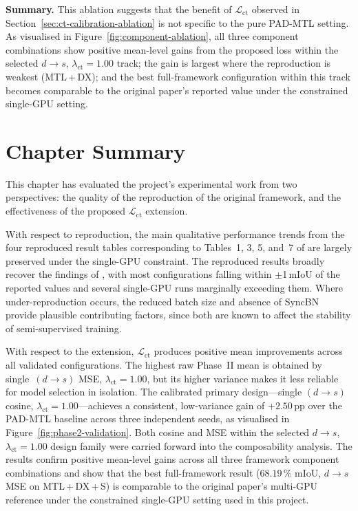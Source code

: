 \vspace{4pt}
\noindent
\textbf{Summary.}
This ablation suggests that the benefit of $\mathcal{L}_\text{ct}$
observed in Section~\ref{sec:ct-calibration-ablation} is not specific to
the pure PAD-MTL setting. As visualised in
Figure~\ref{fig:component-ablation}, all three component combinations
show positive mean-level gains from the proposed loss within the selected
$d{\rightarrow}s$, $\lambda_\text{ct}=1.00$ track; the gain is largest
where the reproduction is weakest (MTL\,+\,DX); and the best
full-framework configuration within this track becomes comparable to the
original paper's reported value under the constrained single-GPU setting.

\section{Chapter Summary}
\label{sec:chapter4_summary}

\noindent
This chapter has evaluated the project's experimental work from two
perspectives: the quality of the reproduction of the original framework,
and the effectiveness of the proposed $\mathcal{L}_\text{ct}$ extension.

With respect to reproduction, the main qualitative performance trends from
the four reproduced result tables corresponding to Tables~1, 3, 5, and~7
of \cite{hoyer2023improving} are largely preserved under the single-GPU
constraint. The reproduced results broadly recover the findings of
\cite{hoyer2023improving}, with most configurations falling within
$\pm$1\,mIoU of the reported values and several single-GPU runs
marginally exceeding them. Where under-reproduction occurs, the
reduced batch size and absence of SyncBN provide plausible contributing
factors, since both are known to affect the stability of semi-supervised
training.

With respect to the extension, $\mathcal{L}_\text{ct}$ produces positive
mean improvements across all validated configurations. The highest raw
Phase~II mean is obtained by single~$(d{\rightarrow}s)$ MSE,
$\lambda_\text{ct}=1.00$, but its higher variance makes it less reliable
for model selection in isolation. The calibrated primary
design---single $(d{\rightarrow}s)$ cosine, $\lambda_\text{ct}=1.00$---achieves a
consistent, low-variance gain of $+2.50$\,pp over the PAD-MTL baseline
across three independent seeds, as visualised in
Figure~\ref{fig:phase2-validation}. Both cosine and MSE within the
selected $d{\rightarrow}s$, $\lambda_\text{ct}=1.00$ design family were
carried forward into the composability analysis. The results confirm
positive mean-level gains across all three framework component
combinations and show that the best full-framework result
($68.19$\,\% mIoU, $d{\rightarrow}s$ MSE on MTL\,+\,DX\,+\,S) is
comparable to the original paper's multi-GPU reference under the
constrained single-GPU setting used in this project.